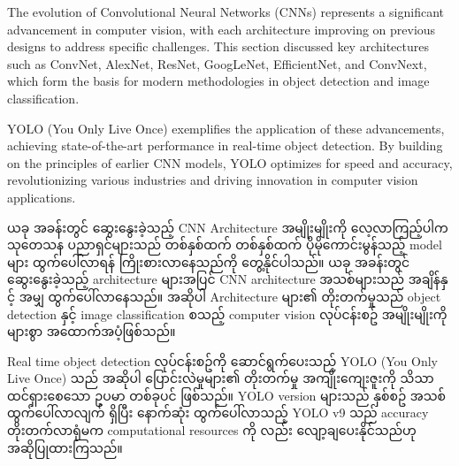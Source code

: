 The evolution of Convolutional Neural Networks (CNNs) represents a significant advancement in computer vision, with each architecture improving on previous designs to address specific challenges. This section discussed key architectures such as ConvNet, AlexNet, ResNet, GoogLeNet, EfficientNet, and ConvNext, which form the basis for modern methodologies in object detection and image classification.

YOLO (You Only Live Once) exemplifies the application of these advancements, achieving state-of-the-art performance in real-time object detection. By building on the principles of earlier CNN models, YOLO optimizes for speed and accuracy, revolutionizing various industries and driving innovation in computer vision applications.

ယခု အခန်းတွင် ဆွေးနွေးခဲ့သည့် CNN Architecture အမျိုးမျိုးကို လေ့လာကြည့်ပါက သုတေသန ပညာရှင်များသည် တစ်နှစ်ထက် တစ်နှစ်ထက် ပိုမိုကောင်းမွန်သည့် model များ ထွက်ပေါ်လာရန် ကြိုးစားလာနေသည်ကို တွေ့နိုင်ပါသည်။  ယခု အခန်းတွင် ဆွေးနွေးခဲ့သည့် architecture များအပြင်  CNN architecture အသစ်များသည် အချိန်နှင့် အမျှ ထွက်ပေါ်လာနေသည်။ အဆိုပါ Architecture များ၏ တိုးတက်မှုသည် object detection နှင့် image classification စသည့် computer vision လုပ်ငန်းစဥ် အမျိုးမျိုးကို များစွာ အထောက်အပံ့ဖြစ်သည်။ 

Real time object detection လုပ်ငန်းစဥ်ကို ဆောင်ရွက်ပေးသည့် YOLO (You Only Live Once)  သည် အဆိုပါ ပြောင်းလဲမှုများ၏ တိုးတက်မှု အကျိုးကျေးဇူးကို သိသာထင်ရှားစေသော ဥပမာ တစ်ခုပင် ဖြစ်သည်။ YOLO version များသည် နှစ်စဥ် အသစ်ထွက်ပေါ်လာလျက် ရှိပြီး နောက်ဆုံး ထွက်ပေါ်လာသည့် YOLO v9 သည် accuracy တိုးတက်လာရုံမက computational resources ကို လည်း လျော့ချပေးနိုင်သည်ဟု အဆိုပြုထားကြသည်။ 


\newpage
